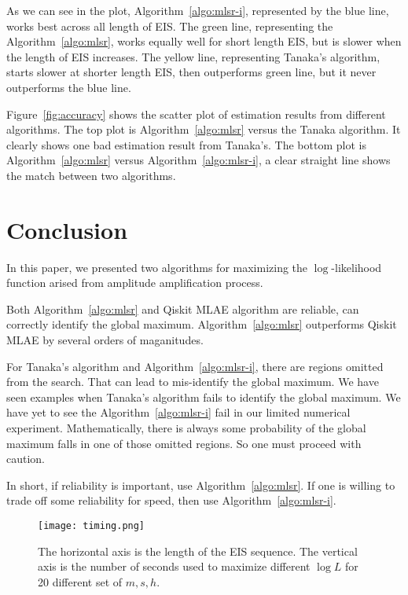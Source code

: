 \documentclass{article}
\begin{document}
As we can see in the plot, Algorithm~\ref{algo:mlsr-i},
represented by the blue line, works best
across all length of EIS.  The green line, representing
the Algorithm~\ref{algo:mlsr}, works equally
well for short length EIS, but is slower when the
length of EIS increases.  The yellow line, representing
Tanaka's algorithm, starts slower at shorter length EIS,
then outperforms green line, but it never outperforms the
blue line.

Figure~\ref{fig:accuracy} shows the scatter plot of estimation
results from different algorithms.  The top plot is 
Algorithm~\ref{algo:mlsr} versus the Tanaka algorithm.
It clearly shows one bad
estimation result from Tanaka's.  The bottom plot is 
Algorithm~\ref{algo:mlsr} versus Algorithm~\ref{algo:mlsr-i},
a clear straight line shows the match between two algorithms.

\section{Conclusion}
In this paper, we presented two algorithms
for maximizing the $\log$-likelihood function
arised from amplitude amplification process.

Both Algorithm~\ref{algo:mlsr} and Qiskit MLAE algorithm are reliable,
can correctly identify the global maximum. Algorithm~\ref{algo:mlsr}
outperforms Qiskit MLAE by several orders of maganitudes.

For Tanaka's algorithm and Algorithm~\ref{algo:mlsr-i}, there are
regions omitted from the search.  That can lead to mis-identify the
global maximum.  We have seen examples when Tanaka's algorithm
fails to identify the global maximum.  We have yet to see the
Algorithm~\ref{algo:mlsr-i} fail in our limited numerical experiment.
Mathematically, there is always some probability of the global
maximum falls in one of those omitted regions. So one must proceed
with caution.

In short, if reliability is important, use Algorithm~\ref{algo:mlsr}.
If one is willing to trade off some reliability for speed, then
use Algorithm~\ref{algo:mlsr-i}.

\begin{figure}
  \begin{center}
    \texttt{[image: timing.png]}
  \end{center}
  \caption{The horizontal axis is the length of the EIS sequence.
    The vertical axis is the number of seconds used to maximize
    different $\log L$ for 20 different set of $m, s, h$.}
  \label{fig:timing}
\end{figure}
\end{document}
